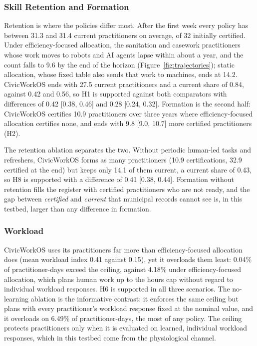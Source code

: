 \documentclass[utf8]{FrontiersinHarvard}
\begin{document}
	\subsubsection*{Skill Retention and Formation}

	Retention is where the policies differ most. After the first week every policy has between 31.3 and 31.4 current practitioners on average, of 32 initially certified. Under efficiency-focused allocation, the sanitation and casework practitioners whose work moves to robots and AI agents lapse within about a year, and the count falls to 9.6 by the end of the horizon (Figure~\ref{fig:trajectories}); static allocation, whose fixed table also sends that work to machines, ends at 14.2. CivicWorkOS ends with 27.5 current practitioners and a current share of 0.84, against 0.42 and 0.56, so H1 is supported against both comparators with differences of 0.42 [0.38, 0.46] and 0.28 [0.24, 0.32]. Formation is the second half: CivicWorkOS certifies 10.9 practitioners over three years where efficiency-focused allocation certifies none, and ends with 9.8 [9.0, 10.7] more certified practitioners (H2).

	The retention ablation separates the two. Without periodic human-led tasks and refreshers, CivicWorkOS forms as many practitioners (10.9 certifications, 32.9 certified at the end) but keeps only 14.1 of them current, a current share of 0.43, so H8 is supported with a difference of 0.41 [0.38, 0.44]. Formation without retention fills the register with certified practitioners who are not ready, and the gap between \textit{certified} and \textit{current} that municipal records cannot see is, in this testbed, larger than any difference in formation.

	\subsubsection*{Workload}

	CivicWorkOS uses its practitioners far more than efficiency-focused allocation does (mean workload index 0.41 against 0.15), yet it overloads them least: 0.04\% of practitioner-days exceed the ceiling, against 4.18\% under efficiency-focused allocation, which plans human work up to the hours cap without regard to individual workload responses. H6 is supported in all three scenarios. The no-learning ablation is the informative contrast: it enforces the same ceiling but plans with every practitioner's workload response fixed at the nominal value, and it overloads on 6.49\% of practitioner-days, the most of any policy. The ceiling protects practitioners only when it is evaluated on learned, individual workload responses, which in this testbed come from the physiological channel.
\end{document}

